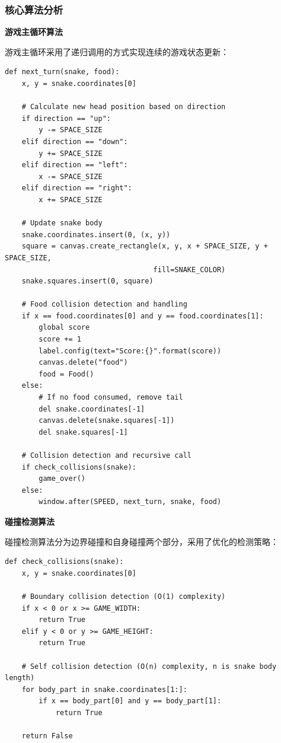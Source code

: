 \documentclass[a4paper]{article}
\begin{document}
\subsubsection{核心算法分析}

\textbf{游戏主循环算法}

游戏主循环采用了递归调用的方式实现连续的游戏状态更新：

\begin{lstlisting}[style=pythoncode, caption=游戏主循环算法]
def next_turn(snake, food):
    x, y = snake.coordinates[0]
    
    # Calculate new head position based on direction
    if direction == "up":
        y -= SPACE_SIZE
    elif direction == "down":
        y += SPACE_SIZE
    elif direction == "left":
        x -= SPACE_SIZE
    elif direction == "right":
        x += SPACE_SIZE
    
    # Update snake body
    snake.coordinates.insert(0, (x, y))
    square = canvas.create_rectangle(x, y, x + SPACE_SIZE, y + SPACE_SIZE, 
                                   fill=SNAKE_COLOR)
    snake.squares.insert(0, square)
    
    # Food collision detection and handling
    if x == food.coordinates[0] and y == food.coordinates[1]:
        global score
        score += 1
        label.config(text="Score:{}".format(score))
        canvas.delete("food")
        food = Food()
    else:
        # If no food consumed, remove tail
        del snake.coordinates[-1]
        canvas.delete(snake.squares[-1])
        del snake.squares[-1]
    
    # Collision detection and recursive call
    if check_collisions(snake):
        game_over()
    else:
        window.after(SPEED, next_turn, snake, food)
\end{lstlisting}

\textbf{碰撞检测算法}

碰撞检测算法分为边界碰撞和自身碰撞两个部分，采用了优化的检测策略：

\begin{lstlisting}[style=pythoncode, caption=碰撞检测算法]
def check_collisions(snake):
    x, y = snake.coordinates[0]
    
    # Boundary collision detection (O(1) complexity)
    if x < 0 or x >= GAME_WIDTH:
        return True
    elif y < 0 or y >= GAME_HEIGHT:
        return True
    
    # Self collision detection (O(n) complexity, n is snake body length)
    for body_part in snake.coordinates[1:]:
        if x == body_part[0] and y == body_part[1]:
            return True
    
    return False
\end{lstlisting}
\end{document}
